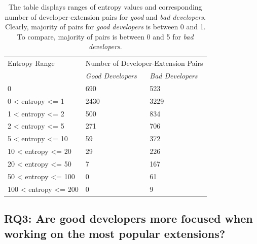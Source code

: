 \begin{table}[h!]
\begin{center}
\begin{tabular}{ |p{5cm}|p{4cm}|p{4cm}|  }
 \hline
 Entropy Range &
 \multicolumn{2}{c|}{Number of Developer-Extension Pairs} \\
 & \textit{Good Developers} & \textit{Bad Developers}\\
 \hline \hline
 0   & 690    & 523 \\
 0 < entropy <= 1 &   2430  & 3229 \\
 1 < entropy <= 2 & 500 & 834\\
 2 < entropy <= 5  & 271 & 706\\
 5 < entropy <= 10 &   59 & 372  \\
 10 < entropy <= 20 & 29  & 226  \\
 20 < entropy <= 50 & 7  & 167 \\
 50 < entropy <= 100 &   0 & 61  \\
 100 < entropy <= 200 &   0 & 9  \\
 \hline
\end{tabular}
\end{center}
\caption[Entropy Ranges. Focus Per Extension]{The table displays ranges of entropy values and corresponding number of developer-extension pairs for \textit{good} and \textit{bad developers}. Clearly, majority of pairs for \textit{good developers} is between 0 and 1. To compare, majority of pairs is between 0 and 5 for \textit{bad developers}.}
\label{table:extensions}
\end{table}

\subsection{RQ3: Are good developers more focused when working on the most popular extensions?}

